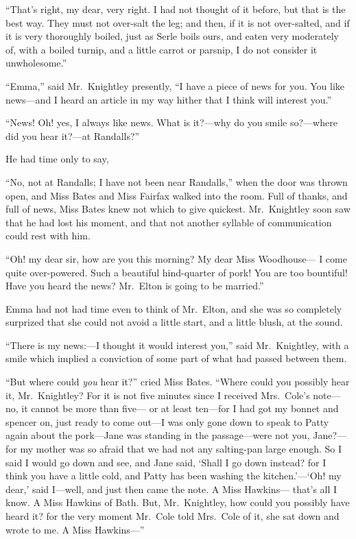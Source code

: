 ``That's right, my dear, very right.  I had not thought of it before,
but that is the best way.  They must not over-salt the leg; and then,
if it is not over-salted, and if it is very thoroughly boiled,
just as Serle boils ours, and eaten very moderately of, with a
boiled turnip, and a little carrot or parsnip, I do not consider
it unwholesome.''

``Emma,'' said Mr.\ Knightley presently, ``I have a piece of news for you.
You like news---and I heard an article in my way hither that I think
will interest you.''

``News!  Oh! yes, I always like news.  What is it?---why do you
smile so?---where did you hear it?---at Randalls?''

He had time only to say,

``No, not at Randalls; I have not been near Randalls,'' when the door
was thrown open, and Miss Bates and Miss Fairfax walked into the room.
Full of thanks, and full of news, Miss Bates knew not which to
give quickest.  Mr.\ Knightley soon saw that he had lost his moment,
and that not another syllable of communication could rest with him.

``Oh! my dear sir, how are you this morning?  My dear Miss Woodhouse---%
I come quite over-powered. Such a beautiful hind-quarter of pork!
You are too bountiful!  Have you heard the news?  Mr.\ Elton is going
to be married.''

Emma had not had time even to think of Mr.\ Elton, and she was
so completely surprized that she could not avoid a little start,
and a little blush, at the sound.

``There is my news:---I thought it would interest you,''
said Mr.\ Knightley, with a smile which implied a conviction
of some part of what had passed between them.

``But where could \emph{you} hear it?'' cried Miss Bates.  ``Where could
you possibly hear it, Mr.\ Knightley?  For it is not five minutes
since I received Mrs.\ Cole's note---no, it cannot be more than five---%
or at least ten---for I had got my bonnet and spencer on, just ready
to come out---I was only gone down to speak to Patty again about
the pork---Jane was standing in the passage---were not you, Jane?---%
for my mother was so afraid that we had not any salting-pan
large enough.  So I said I would go down and see, and Jane said,
`Shall I go down instead? for I think you have a little cold,
and Patty has been washing the kitchen.'---`Oh! my dear,'
said I---well, and just then came the note.  A Miss Hawkins---%
that's all I know.  A Miss Hawkins of Bath.  But, Mr.\ Knightley,
how could you possibly have heard it? for the very moment Mr.\ Cole
told Mrs.\ Cole of it, she sat down and wrote to me.  A Miss Hawkins---''

